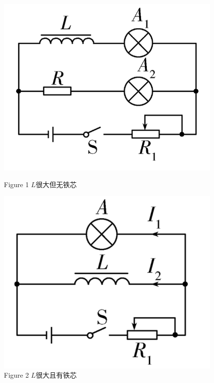 \documentclass{article}
\begin{document}
\begin{figure}[h]
    \begin{minipage}{0.45\textwidth}
        \centering
        \includegraphics[width = \textwidth]{pictures/1.png}
        \caption*{Figure 1 $L$很大但无铁芯}
    \end{minipage}
    \hfill
    \begin{minipage}{0.43\textwidth}
        \includegraphics[width = \textwidth]{pictures/2.png}
        \caption*{Figure 2 $L$很大且有铁芯}
    \end{minipage}
\end{figure}
\end{document}
